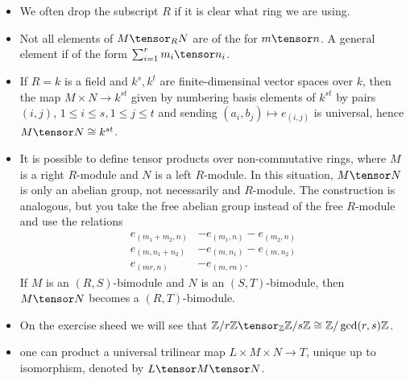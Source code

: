\begin{itemize}
	\item We often drop the subscript $R$ if it is clear what ring we are using.
	\item Not all elements of $M\tensor_R N$ are of the for $m\tensor n$. A general element
		if of the form $\sum_{i=1}^r m_i\tensor n_i$.
	\item If $R = k$ is a field and $k^s, k^t$ are finite-dimensinal vector spaces
		over $k$, then the map $M\times N \to k^{st}$ given by numbering basis elements
		of  $k^{st}$ by pairs $(i, j)$, $1\leq i\leq s, 1\leq j\leq t$ and sending
		$(a_i, b_j)\mapsto e_{(i, j)}$ is universal, hence $M\tensor N\cong k^{st}$.
	\item It is possible to define tensor products over non-commutative rings,
		where $M$ is a right $R$-module and $N$ is a left $R$-module. In this
		situation, $M\tensor N$ is only an abelian group, not necessarily and
		$R$-module. The construction is analogous, but you take the free abelian
		group instead of the free $R$-module and use the relations
		\begin{align*}
			e_{(m_1 + m_2, n)} &- e_{(m_1, n)} - e_{(m_2, n)}\\
			e_{(m, n_1 + n_2)} &- e_{(m, n_1)} - e_{(m, n_2)}\\
			e_{(mr, n)} &- e_{(m, rn)}.
		\end{align*}
		If $M$ is an $(R, S)$-bimodule and $N$ is an $(S, T)$-bimodule, then
		$M\tensor N$ becomes a $(R, T)$-bimodule.
	\item On the exercise sheed we will see that
		$\mathbb{Z}/r\mathbb{Z} \tensor_\mathbb{Z} \mathbb{Z}/s\mathbb{Z} \cong \mathbb{Z}/\gcd(r, s)\mathbb{Z}$.
	\item one can product a universal trilinear map $L\times M\times N\to T$, unique
		up to isomorphism, denoted by $L\tensor M\tensor N$.
\end{itemize}
